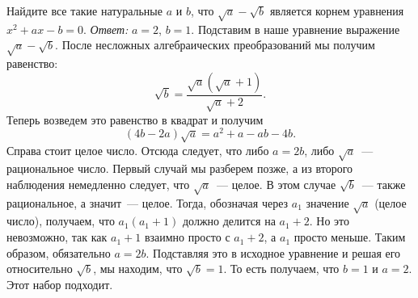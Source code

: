 \problem
Найдите все такие натуральные $a$ и $b$, что $\sqrt{a} - \sqrt{b}$ является
корнем уравнения $x^2 + a x - b = 0$.
\solution
\emph{Ответ:} $a = 2$, $b = 1$.
Подставим в наше уравнение выражение $\sqrt{a} - \sqrt{b}$.
После несложных алгебраических преобразований мы получим равенство: 
\[
    \sqrt{b}
=
    \frac{\sqrt{a}(\sqrt{a} + 1)}{\sqrt{a} + 2}
.\]
Теперь возведем это равенство в квадрат и получим
\[
    (4 b - 2 a) \sqrt{a}
=
    a^2 + a - a b - 4 b
.\]
Справа стоит целое число.
Отсюда следует, что либо $a = 2 b$, либо $\sqrt{a}$~--- рациональное число.
Первый случай мы разберем позже, а из второго наблюдения немедленно следует,
что $\sqrt{a}$~--- целое.
В этом случае $\sqrt{b}$~--- также рациональное, а значит~--- целое.
Тогда, обозначая через $a_1$ значение $\sqrt{a}$ (целое число), получаем, что
$a_1 (a_1 + 1)$ должно делится на $a_1 + 2$.
Но это невозможно, так как $a_1 + 1$ взаимно просто с $a_1 + 2$, а $a_1$ просто
меньше.
Таким образом, обязательно $a = 2 b$.
Подставляя это в исходное уравнение и решая его относительно $\sqrt{b}$, мы
находим, что $\sqrt{b} = 1$.
То есть получаем, что $b = 1$ и $a = 2$.
Этот набор подходит.
\endproblem
